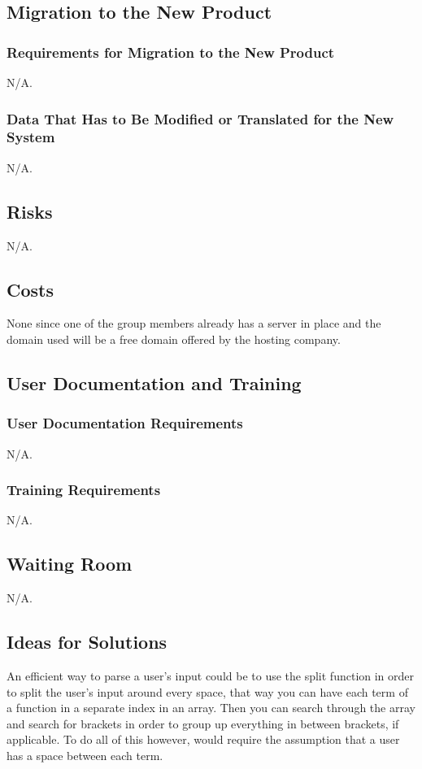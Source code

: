 \documentclass[11pt, oneside]{article}
\begin{document}
\subsection{Migration to the New Product}
\subsubsection{Requirements for Migration to the New Product}
N/A.


\subsubsection{Data That Has to Be Modified or Translated for the New System}
N/A.


\subsection{Risks}
N/A.


\subsection{Costs}
None since one of the group members already has a server in place and the domain used will be a free domain offered by the hosting company.

\subsection{User Documentation and Training}
\subsubsection{User Documentation Requirements}
N/A.


\subsubsection{Training Requirements}
N/A.


\subsection{Waiting Room}
N/A.


\subsection{Ideas for Solutions}
An efficient way to parse a user’s input could be to use the split function in order to split the user’s input around every space, that way you can have each term of a function in a separate index in an array. Then you can search through the array and search for brackets in order to group up everything in between brackets, if applicable. To do all of this however, would require the assumption that a user has a space between each term.
\end{document}
